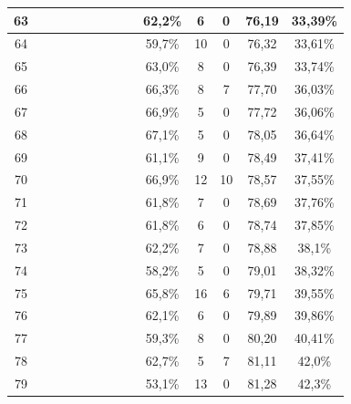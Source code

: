 \begin{longtable}{|c|c|c|c|c|c|c|c|c|c|c|c|c|c|}
63  &  \x    & \x    & \x    & \x    & \x    & \x\m  &       & \x\m  & 62,2\% &  6  & 0  & 76,19 & 33,39\% \\ \hline
64  &  \x    & \x    & \x    &       &       &       &       &       & 59,7\% &  10 & 0  & 76,32 & 33,61\% \\ \hline
65  &  \x    & \x    & \x    &       & \x    &       & \x\m  &       & 63,0\% &  8  & 0  & 76,39 & 33,74\% \\ \hline
66  &  \x    & \x    & \x    & \x    & \x\m  &       & \x\m  &       & 66,3\% &  8  & 7  & 77,70 & 36,03\% \\ \hline
67  &  \x    & \x    & \x    &       & \x\m  & \x    & \x    &       & 66,9\% &  5  & 0  & 77,72 & 36,06\% \\ \hline
68  &  \x    & \x    & \x    & \x    & \x\m  &       & \x    &       & 67,1\% &  5  & 0  & 78,05 & 36,64\% \\ \hline
69  &  \x    & \x    & \x    & \x    &       & \x\m  &       & \x    & 61,1\% &  9  & 0  & 78,49 & 37,41\% \\ \hline
70  &  \x    & \x    &       & \x    & \x\m  & \x\m  &       & \x\m  & 66,9\% &  12 & 10 & 78,57 & 37,55\% \\ \hline
71  &  \x    & \x    & \x    & \x    & \x    &       &       & \x    & 61,8\% &  7  & 0  & 78,69 & 37,76\% \\ \hline
72  &  \x    & \x    & \x    &       & \x    & \x\m  &       & \x\m  & 61,8\% &  6  & 0  & 78,74 & 37,85\% \\ \hline
73  &  \x    & \x    & \x    &       & \x    & \x\m  &       &       & 62,2\% &  7  & 0  & 78,88 & 38,1\% \\ \hline
74  &  \x    & \x    &       & \x    & \x    & \x    &       &       & 58,2\% &  5  & 0  & 79,01 & 38,32\% \\ \hline
75  &  \x    & \x    &       &       & \x\m  & \x\m  & \x\m  &       & 65,8\% &  16 & 6  & 79,71 & 39,55\% \\ \hline
76  &  \x    & \x    & \x    & \x    &       &       & \x    &       & 62,1\% &  6  & 0  & 79,89 & 39,86\% \\ \hline
77  &  \x    & \x    & \x    &       &       & \x\m  &       & \x\m  & 59,3\% &  8  & 0  & 80,20 & 40,41\% \\ \hline
78  &  \x    & \x    & \x    & \x    & \x    & \x\m  &       & \x    & 62,7\% &  5  & 7  & 81,11 & 42,0\% \\ \hline
79  &  \x    & \x    &       &       &       &       &       &       & 53,1\% &  13 & 0  & 81,28 & 42,3\% \\ \hline

\end{longtable}
